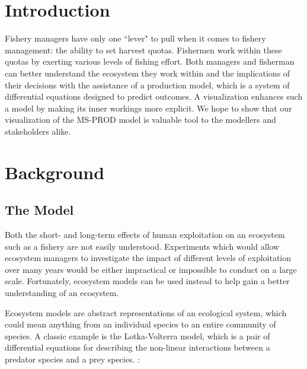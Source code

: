 \documentclass{article}
\begin{document}
\section{Introduction}

Fishery managers have only one ``lever" to pull when it comes to fishery management: the ability to set harvest quotas.  Fishermen work within these quotas by exerting various levels of fishing effort.  Both managers and fisherman can better understand the ecosystem they work within and the implications of their decisions with the assistance of a production model, which is a system of differential equations designed to predict outcomes.  A visualization enhances such a model by making its inner workings more explicit. We hope to show that our visualization of the MS-PROD model is valuable tool to the modellers and stakeholders alike. %

\section{Background}

\subsection{The Model}%

Both the short- and long-term effects of human exploitation on an ecosystem such as a fishery are not easily understood.  Experiments which would allow ecosystem managers to investigate the impact of different levels of exploitation over many years would be either impractical or impossible to conduct on a large scale.  Fortunately, ecosystem models can be used instead to help gain a better understanding of an ecosystem.

Ecosystem models are abstract representations of an ecological system, which could mean anything from an individual species to an entire community of species.  A classic example is the Lotka-Volterra model, which is a pair of differential equations for describing the non-linear interactions between a predator species and a prey species. \cite{Lotka1926fds, VOL26a}:
\end{document}
